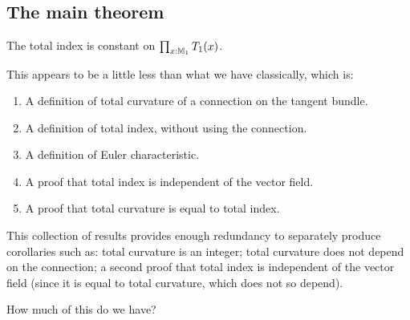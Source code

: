 \subsection{The main theorem}
\begin{mythm}
The total index is constant on \( \prod_{x:\mathbb{M}_1}T_1(x) \).
\end{mythm}

This appears to be a little less than what we have classically, which is:
\begin{enumerate}
\item A definition of total curvature of a connection on the tangent bundle.
\item A definition of total index, without using the connection.
\item A definition of Euler characteristic.
\item A proof that total index is independent of the vector field.
\item A proof that total curvature is equal to total index.
\end{enumerate}
This collection of results provides enough redundancy to separately produce corollaries such as: total curvature is an integer; total curvature does not depend on the connection; a second proof that total index is independent of the vector field (since it is equal to total curvature, which does not so depend).

How much of this do we have?
